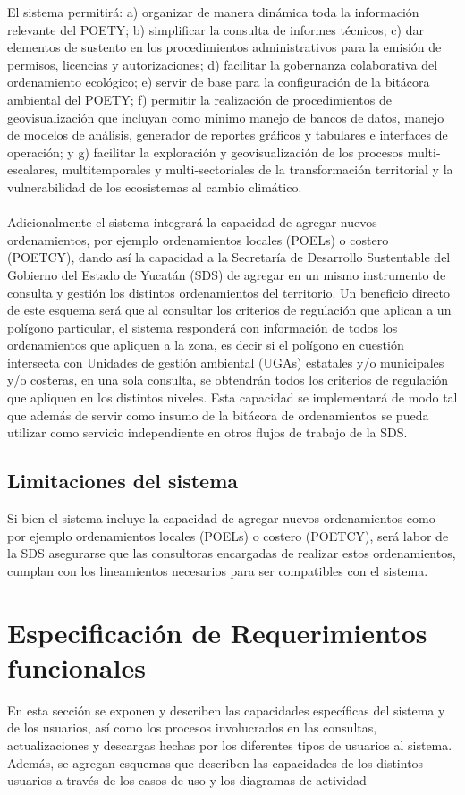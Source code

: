 El sistema permitirá: a) organizar de manera dinámica toda la información relevante del POETY; b) simplificar la consulta de informes técnicos; c) dar elementos de sustento en los procedimientos administrativos para la emisión de permisos, licencias y autorizaciones; d) facilitar la gobernanza colaborativa del ordenamiento ecológico; e) servir de base para la configuración de la bitácora ambiental del POETY; f) permitir la realización de procedimientos de geovisualización que incluyan como mínimo manejo de bancos de datos, manejo de modelos de análisis, generador de reportes gráficos y tabulares e interfaces de operación; y g) facilitar la exploración y geovisualización de los procesos multi-escalares, multitemporales y multi-sectoriales de la transformación territorial y la vulnerabilidad de los ecosistemas al cambio climático.
\\
\\
Adicionalmente el sistema integrará la capacidad de agregar nuevos ordenamientos, por ejemplo ordenamientos locales (POELs) o costero (POETCY), dando así la capacidad a la Secretaría de Desarrollo Sustentable del Gobierno del Estado de Yucatán (SDS) de agregar en un mismo instrumento de consulta y gestión los distintos ordenamientos del territorio. Un beneficio directo de este esquema será que al consultar los criterios de regulación que aplican a un polígono particular, el sistema responderá con información de todos los ordenamientos que apliquen a la zona, es decir si el polígono en cuestión intersecta con Unidades de gestión ambiental (UGAs) estatales y/o municipales y/o costeras, en una sola consulta, se obtendrán todos los criterios de regulación que apliquen en los distintos niveles. Esta capacidad se implementará de modo tal que además de servir como insumo de la bitácora de ordenamientos se pueda utilizar como servicio independiente en otros flujos de trabajo de la SDS.


\subsection{Limitaciones del sistema}

Si bien el sistema incluye la capacidad de agregar nuevos ordenamientos como por ejemplo ordenamientos locales (POELs) o costero (POETCY), será labor de la SDS asegurarse que las consultoras encargadas de realizar estos ordenamientos, cumplan con los lineamientos necesarios para ser compatibles con el sistema.

\section{Especificación de Requerimientos funcionales}
En esta sección se exponen y describen las capacidades específicas del sistema y de los usuarios, así como los procesos involucrados en las consultas, actualizaciones y descargas hechas por los diferentes tipos de usuarios al sistema. Además, se agregan esquemas que describen las capacidades de los distintos usuarios a través de los casos de uso y los diagramas de actividad
\\
\\

